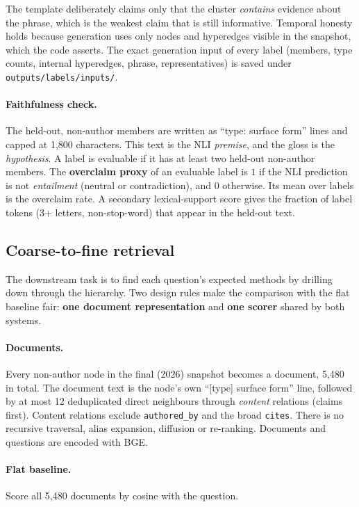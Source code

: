 \documentclass[11pt,a4paper]{article}
\theoremstyle{remark}
\newcommand{\code}[1]{\texttt{\small #1}}
\begin{document}
The template deliberately claims only that the cluster \emph{contains} evidence about
the phrase, which is the weakest claim that is still informative. Temporal honesty
holds because generation uses only nodes and hyperedges visible in the snapshot, which
the code asserts. The exact generation input of every label (members, type counts,
internal hyperedges, phrase, representatives) is saved under
\code{outputs/labels/inputs/}.

\paragraph{Faithfulness check.}
The held-out, non-author members are written as ``type: surface form'' lines and capped
at 1{,}800 characters. This text is the NLI \emph{premise}, and the gloss is the
\emph{hypothesis}. A label is evaluable if it has at least two held-out non-author
members. The \textbf{overclaim proxy} of an evaluable label is $1$ if the NLI prediction
is not \emph{entailment} (neutral or contradiction), and $0$ otherwise. Its mean over
labels is the overclaim rate. A secondary lexical-support score gives the fraction of
label tokens (3+ letters, non-stop-word) that appear in the held-out text.

\subsection{Coarse-to-fine retrieval}
\label{sec:retrieval-method}

The downstream task is to find each question's expected methods by drilling down
through the hierarchy. Two design rules make the comparison with the flat baseline fair:
\textbf{one document representation} and \textbf{one scorer} shared by both systems.

\paragraph{Documents.}
Every non-author node in the final (2026) snapshot becomes a document, 5{,}480 in total.
The document text is the node's own ``[type] surface form'' line, followed by at most 12
deduplicated direct neighbours through \emph{content} relations (claims first). Content
relations exclude \code{authored\_by} and the broad \code{cites}. There is no recursive
traversal, alias expansion, diffusion or re-ranking. Documents and questions are
encoded with BGE.

\paragraph{Flat baseline.} Score all 5{,}480 documents by cosine with the question.
\end{document}
